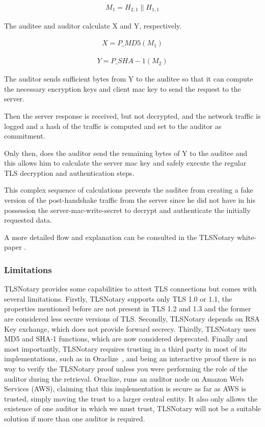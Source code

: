\begin{ceqn}
    \begin{align}
        M_{1} = H_{2,1} \parallel H_{1,1}
    \end{align}
\end{ceqn}

The auditee and auditor calculate X and Y, respectively.

\begin{ceqn}
    \begin{align}
        X = P\_MD5(M_{1})
    \end{align}
\end{ceqn}

\begin{ceqn}
    \begin{align}
        Y = P\_SHA-1(M_{2})
    \end{align}
\end{ceqn}

The auditor sends sufficient bytes from Y to the auditee so that it can compute the necessary encryption keys and client mac key to send the request to the server.

Then the server response is received, but not decrypted, and the network traffic is logged and a hash of the traffic is computed and set to the auditor as commitment.

Only then, does the auditor send the remaining bytes of Y to the auditee and this allows him to calculate the server mac key and safely execute the regular TLS decryption and authentication steps.

This complex sequence of calculations prevents the auditee from creating a fake version of the post-handshake traffic from the server since he did not have in his possession the server-mac-write-secret to decrypt and authenticate the initially requested data.

A more detailed flow and explanation can be consulted in the TLSNotary white-paper \cite{TLSNotar}.


\subsubsection{Limitations}
TLSNotary provides some capabilities to attest TLS connections but comes with several limitations. Firstly, TLSNotary supports only TLS 1.0 or 1.1, the properties mentioned before are not present in TLS 1.2 and 1.3 and the former are considered less secure versions of TLS. Secondly, TLSNotary depends on RSA Key exchange, which does not provide forward secrecy. Thirdly, TLSNotary uses MD5 and SHA-1 functions, which are now considered deprecated. Finally and most importantly, TLSNotary requires trusting in a third party in most of its implementations, such as in Oraclize~\cite{Oraclize.it2018}, and being an interactive proof there is no way to verify the TLSNotary proof unless you were performing the role of the auditor during the retrieval. Oraclize, runs an auditor node on Amazon Web Services (AWS), claiming that this implementation is secure as far as AWS is trusted, simply moving the trust to a larger central entity. It also only allows the existence of one auditor in which we must trust, TLSNotary will not be a suitable solution if more than one auditor is required.


